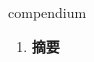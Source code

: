
\begin{frame}
{\huge compendium}
\begin{center}
\begin{enumerate}\Large
  \item \textbf{摘要}
\end{enumerate}
\end{center}
\end{frame}
